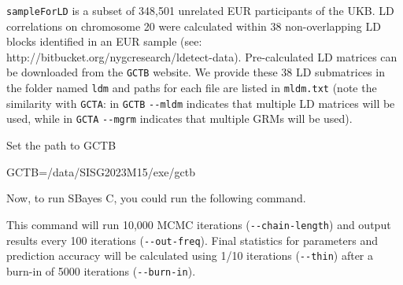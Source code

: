 \documentclass[
  letterpaper,
  DIV=11,
  numbers=noendperiod]{scrartcl}
\newenvironment{Shaded}{\begin{snugshade}}{\end{snugshade}}
\newcommand{\AttributeTok}[1]{\textcolor[rgb]{0.40,0.45,0.13}{#1}}
\newcommand{\DataTypeTok}[1]{\textcolor[rgb]{0.68,0.00,0.00}{#1}}
\newcommand{\NormalTok}[1]{\textcolor[rgb]{0.00,0.23,0.31}{#1}}
\newcommand{\OperatorTok}[1]{\textcolor[rgb]{0.37,0.37,0.37}{#1}}
\newcommand{\VariableTok}[1]{\textcolor[rgb]{0.07,0.07,0.07}{#1}}
\begin{document}
\texttt{sampleForLD} is a subset of 348,501 unrelated EUR participants
of the UKB. LD correlations on chromosome 20 were calculated within 38
non-overlapping LD blocks identified in an EUR sample (see:
http://bitbucket.org/nygcresearch/ldetect-data). Pre-calculated LD
matrices can be downloaded from the \texttt{GCTB} website. We provide
these 38 LD submatrices in the folder named \texttt{ldm} and paths for
each file are listed in \texttt{mldm.txt} (note the similarity with
\texttt{GCTA}: in \texttt{GCTB} \texttt{-\/-mldm} indicates that
multiple LD matrices will be used, while in \texttt{GCTA}
\texttt{-\/-mgrm} indicates that multiple GRMs will be used).

Set the path to GCTB

\begin{Shaded}
\begin{Highlighting}[]
\VariableTok{GCTB}\OperatorTok{=}\NormalTok{/data/SISG2023M15/exe/gctb}
\end{Highlighting}
\end{Shaded}

Now, to run SBayes C, you could run the following command.

\begin{Shaded}
\end{Shaded}

This command will run 10,000 MCMC iterations (\texttt{-\/-chain-length})
and output results every 100 iterations (\texttt{-\/-out-freq}). Final
statistics for parameters and prediction accuracy will be calculated
using 1/10 iterations (\texttt{-\/-thin}) after a burn-in of 5000
iterations (\texttt{-\/-burn-in}).
\end{document}
